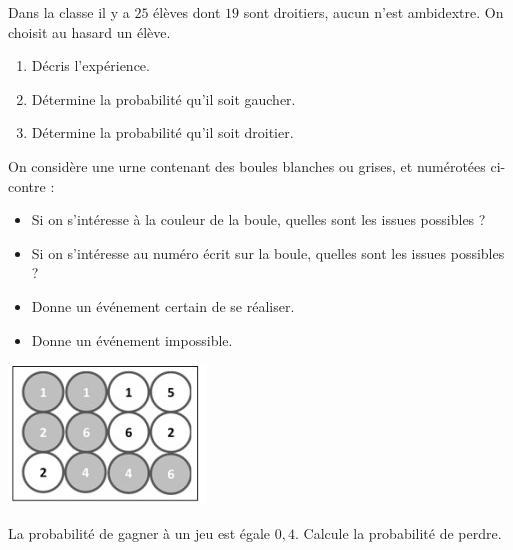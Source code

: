 \begin{pageParcoursd} 


 
 
Dans la classe il y a $25$ élèves dont $19$ sont droitiers, aucun n'est ambidextre. On choisit au hasard un élève.
\begin{enumerate}[leftmargin=*]
\item Décris l'expérience.
\item Détermine la probabilité qu'il soit gaucher.
\item Détermine la probabilité qu'il soit droitier.
\end{enumerate}
 
 
 
 
 \begin{minipage}{.7\linewidth}
 
 On considère une urne contenant des boules blanches ou grises, et numérotées ci-contre :
  \begin{itemize}[leftmargin=*]
\item Si on s'intéresse à la couleur de la boule, quelles sont les issues possibles ?
\item Si on s'intéresse au numéro écrit sur la boule, quelles sont les issues possibles ?
\item Donne un événement certain de se réaliser. 
\item Donne un événement impossible. 
 \end{itemize}

 \end{minipage}
 \begin{minipage}{.3\linewidth}
\includegraphics[scale=1]{FIG/boule.jpg} 

 \end{minipage}
 

La probabilité de gagner à un jeu est égale $0,4$. Calcule la probabilité de perdre. 


\end{pageParcoursd}
